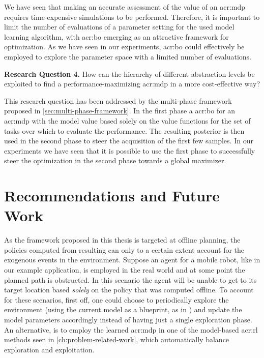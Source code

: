 We have seen that making an accurate assessment of the value of an \acrshort{acr:mdp} requires time-expensive simulations to be performed.
Therefore, it is important to limit the number of evaluations of a parameter setting for the used model learning algorithm, with \acrshort{acr:bo} emerging as an attractive framework for optimization.
As we have seen in our experiments, \acrshort{acr:bo} could effectively be employed to explore the parameter space with a limited number of evaluations.

\newpage

\vspace{16pt}
\noindent%
\textbf{Research Question 4.} How can the hierarchy of different abstraction levels be exploited to find a performance-maximizing \acrshort{acr:mdp} in a more cost-effective way?
\vspace{12pt}

This research question has been addressed by the multi-phase framework proposed in \autoref{sec:multi-phase-framework}.
In the first phase a \acrshort{acr:bo} for an \acrshort{acr:mdp} with the model value based solely on the value functions for the set of tasks over which to evaluate the performance.
The resulting posterior is then used in the second phase to steer the acquisition of the first few samples.
In our experiments we have seen that it is possible to use the first phase to successfully steer the optimization in the second phase towards a global maximizer.


\section{Recommendations and Future Work}
\label{sec:recommendations-future-work}

As the framework proposed in this thesis is targeted at offline planning, the policies computed from resulting  can only to a certain extent account for the exogenous events in the environment.
Suppose an agent for a mobile robot, like in our example application, is employed in the real world and at some point the planned path is obstructed.
In this scenario the agent will be unable to get to its target location based \textit{solely} on the policy that was computed offline.
To account for these scenarios, first off, one could choose to periodically explore the environment (using the current model as a blueprint, as in \cite{epshteyn2008active}) and update the model parameters accordingly instead of having just a single exploration phase.
An alternative, is to employ the learned \acrshort{acr:mdp} in one of the model-based \acrshort{acr:rl} methods seen in \autoref{ch:problem-related-work}, which automatically balance exploration and exploitation.

